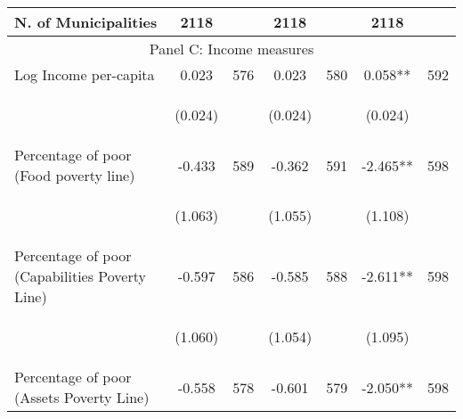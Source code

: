 \begin{tabular}{lcccccc}
N. of Municipalities  &   2118   &  &  2118    & &  2118  &    \\

\hline		

\multicolumn{7}{c}{Panel C: Income measures} \\

Log Income per-capita    &  0.023   &  576  &   0.023  &  580 &  0.058**  &  592   \\

\vspace{4pt} &  \begin{footnotesize}(0.024)\end{footnotesize}   & &
			    \begin{footnotesize}(0.024)\end{footnotesize}   & &
			    \begin{footnotesize}(0.024)\end{footnotesize}   &
			     \\          


Percentage of poor (Food poverty line)     &  -0.433   &  589  &   -0.362  &  591 &  -2.465**  &  598   \\

\vspace{4pt} &  \begin{footnotesize}(1.063)\end{footnotesize}   & &
			    \begin{footnotesize}(1.055)\end{footnotesize}   & &
			    \begin{footnotesize}(1.108)\end{footnotesize}   &
			     \\


Percentage of poor (Capabilities Poverty Line)     &  -0.597   &  586  &   -0.585  &  588 &  -2.611**  &  598   \\

\vspace{4pt} &  \begin{footnotesize}(1.060)\end{footnotesize}   & &
			    \begin{footnotesize}(1.054)\end{footnotesize}   & &
			    \begin{footnotesize}(1.095)\end{footnotesize}   &
			     \\
 
Percentage of poor (Assets Poverty Line)    &  -0.558   &  578  &   -0.601  &  579 &  -2.050**  &  598   \\


\end{tabular}
